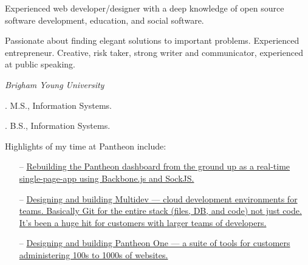 \documentclass[11pt]{article}
\begin{document}
\medskip

\reversemarginpar

\medskip

\medskip
{}

\noindent Experienced web developer/designer with a deep knowledge of open source software development, education, and social software.

\medskip

\noindent Passionate about finding elegant solutions to important problems. Experienced entrepreneur. Creative, risk taker, strong writer and communicator, experienced at public speaking.

\bigskip



\noindent\emph{Brigham Young University \vspace{0.15in}}

. M.S., Information Systems.

. B.S., Information Systems.

\bigskip

\medskip


\noindent Highlights of my time at Pantheon include:

\begin{itemize}
  \item[--] \href{https://www.getpantheon.com/news/apollo-launched}{Rebuilding the Pantheon dashboard from the ground up as a real-time single-page-app using Backbone.js and SockJS.}
  \item[--] \href{http://techcrunch.com/2013/07/10/pantheon-multidev/}{Designing and building Multidev — cloud development environments for teams. Basically Git for the entire stack (files, DB, and code) not just code. It’s been a huge hit for customers with larger teams of developers.}
  \item[--] \href{https://www.getpantheon.com/pantheon-one}{Designing and building Pantheon One — a suite of tools for customers administering 100s to 1000s of websites.}
\end{itemize}
\end{document}

